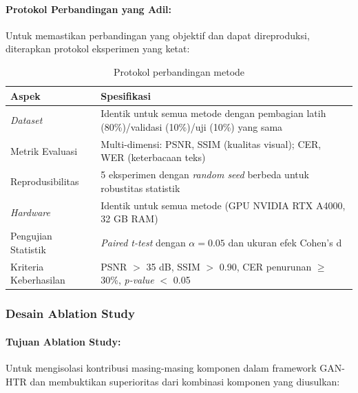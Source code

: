 \documentclass[12pt,a4paper]{article}
\begin{document}
\paragraph{Protokol Perbandingan yang Adil:}
Untuk memastikan perbandingan yang objektif dan dapat direproduksi, diterapkan protokol eksperimen yang ketat:

\begin{table}[H]
\centering
\caption{Protokol perbandingan metode}
\label{tab:comparison-protocol}
\small
\begin{tabular}{|l|p{10cm}|}
\hline
\textbf{Aspek} & \textbf{Spesifikasi} \\ \hline
\textit{Dataset} & Identik untuk semua metode dengan pembagian latih (80\%)/validasi (10\%)/uji (10\%) yang sama \\ \hline
Metrik Evaluasi & Multi-dimensi: PSNR, SSIM (kualitas visual); CER, WER (keterbacaan teks) \\ \hline
Reprodusibilitas & 5 eksperimen dengan \textit{random seed} berbeda untuk robustitas statistik \\ \hline
\textit{Hardware} & Identik untuk semua metode (GPU NVIDIA RTX A4000, 32 GB RAM) \\ \hline
Pengujian Statistik & \textit{Paired t-test} dengan $\alpha = 0.05$ dan ukuran efek Cohen's d \\ \hline
Kriteria Keberhasilan & PSNR $>$ 35 dB, SSIM $>$ 0.90, CER penurunan $\geq$ 30\%, \textit{p-value} $<$ 0.05 \\ \hline
\end{tabular}
\end{table}

\subsubsection{Desain Ablation Study}
\paragraph{Tujuan Ablation Study:}
Untuk mengisolasi kontribusi masing-masing komponen dalam framework GAN-HTR dan membuktikan superioritas dari kombinasi komponen yang diusulkan:
\end{document}
